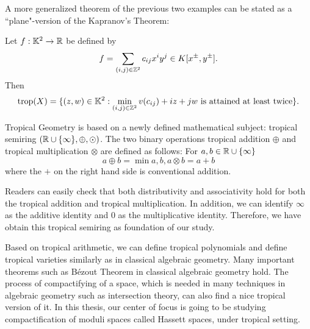     A more generalized theorem of the previous two examples 
    can be stated as a ``plane"-version of the Kapranov's Theorem:
    \begin{theorem}
    	Let $f: \mathbb{K}^2 \rightarrow \mathbb{R}$ be defined by
	    \[
	    f = \sum\limits_{(i, j) \in \mathbb{Z}^2} c_{ij} x^i y^j \in K[x^{\pm}, y^{\pm}].
	    \]
	    Then 
	    \[
	    \operatorname{trop}(X) = \{(z, w) \in \mathbb{K}^2: \min\limits_{(i, j) \in \mathbb{Z}^2} v(c_{ij}) + iz + jw \text{ is attained at least twice}\}.
	    \]
    \end{theorem}
    Tropical Geometry is based on a newly defined mathematical subject: 
    tropical semiring $(\mathbb{R} \cup \{\infty\}, \oplus, \odot)$.
    The two binary operations tropical addition $\oplus$ and tropical multiplication $\otimes$ are defined as follows:
    For $a, b \in \mathbb{R} \cup \{\infty\}$
    \[
    a \oplus b = \min{a, b},
    a \otimes b = a + b
    \] where the $+$ on the right hand side is conventional addition. 
    
    Readers can easily check that both distributivity and associativity hold for both the tropical addition and tropical multiplication.
    In addition, we can identify $\infty$ as the additive identity and $0$ as the multiplicative identity. 
    Therefore, we have obtain this tropical semiring as foundation of our study.
    
    Based on tropical arithmetic, 
    we can define tropical polynomials and define tropical varieties similarly as in classical algebraic geometry.
    Many important theorems such as B\'{e}zout Theorem in classical algebraic geometry hold. 
    The process of
    compactifying of a space, 
    which is needed in many techniques in algebraic geometry such as intersection theory,
    can also find a nice tropical version of it.
    In this thesis, 
    our center of focus is going to be studying compactification of moduli spaces called Hassett spaces, 
    under tropical setting.
